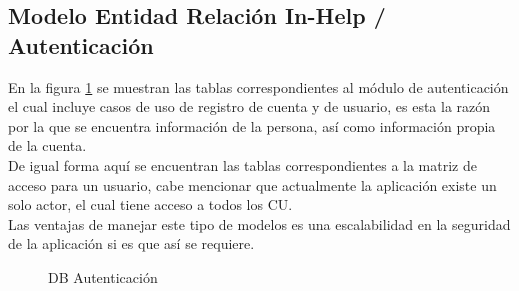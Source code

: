 \subsection{Modelo Entidad Relación In-Help / Autenticación}
En la figura \ref{fig:BD_Autenticacion} se muestran las tablas correspondientes al módulo de autenticación el cual incluye casos de uso de registro de cuenta y de usuario, es esta la razón por la que se encuentra información de la persona, así como información propia de la cuenta.\\
De igual forma aquí se encuentran las tablas correspondientes a la matriz de acceso para un usuario, cabe mencionar que actualmente la aplicación existe un solo actor, el cual tiene acceso a todos los CU.\\
Las ventajas de manejar este tipo de modelos es una escalabilidad en la seguridad de la aplicación si es que así se requiere.
\begin{figure}[htbp!]
	\centering
	\caption{DB Autenticación}
	\label{fig:BD_Autenticacion}
\end{figure}

